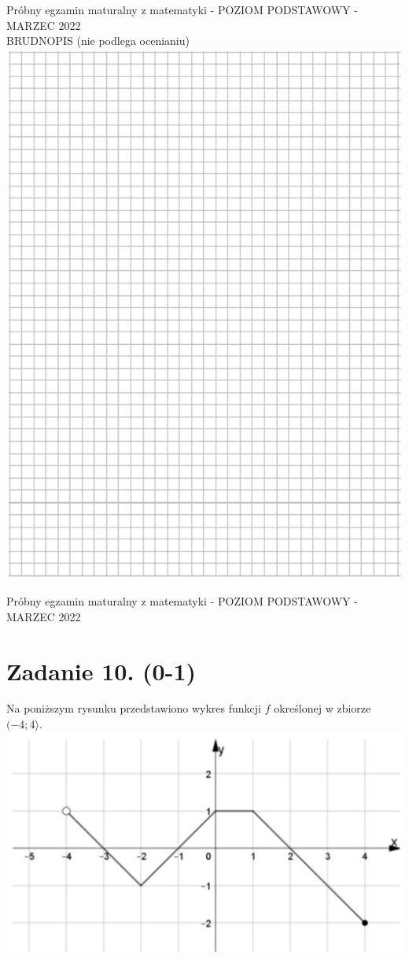 \documentclass[10pt]{article}
\begin{document}
Próbny egzamin maturalny z matematyki - POZIOM PODSTAWOWY - MARZEC 2022\\
BRUDNOPIS (nie podlega ocenianiu)\\
\includegraphics[max width=\textwidth, center]{2024_11_21_fd555512e32c497e8a5dg-05}

Próbny egzamin maturalny z matematyki - POZIOM PODSTAWOWY - MARZEC 2022

\section*{Zadanie 10. (0-1)}
Na poniższym rysunku przedstawiono wykres funkcji \(f\) określonej w zbiorze \((-4 ; 4\rangle\).\\
\includegraphics[max width=\textwidth, center]{2024_11_21_fd555512e32c497e8a5dg-06}
\end{document}
